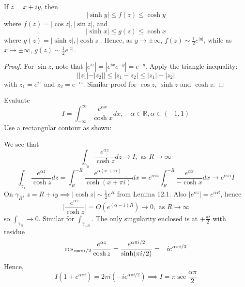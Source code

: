 \documentclass[a4paper]{article}
\begin{document}
\begin{lemma}
If $z=x+iy$, then
$$|\sinh y|\leq f(z)\leq\cosh y$$
where $f(z)=|\cos z|,|\sin z|$, and
$$|\sinh x|\leq g(z)\leq\cosh x$$
where $g(z)=|\sinh z|,|\cosh z|$. Hence, as $y\rightarrow\pm\infty$, $f(z)\sim\frac{1}{2}e^{|y|}$, while as $x\rightarrow\pm\infty$, $g(z)\sim\frac{1}{2}e^{|x|}$.
\end{lemma}
\begin{proof}
For $\sin z$, note that $|e^{iz}|=|e^{ix}e^{-y}|=e^{-y}$. Apply the triangle inequality:
$$||z_1|-|z_2||\leq|z_1-z_2|\leq|z_1|+|z_2|$$
with $z_1=e^{iz}$ and $z_2=e^{-iz}$. Similar proof for $\cos z$, $\sinh z$ and $\cosh z$.
\end{proof}
\begin{eg}
Evaluate
$$I=\int_{-\infty}^\infty\frac{e^{\alpha x}}{\cosh x}dx,\quad \alpha\in\mathbb{R},\alpha\in(-1,1)$$
Use a rectangular contour as shown:
  \begin{center}
  \end{center}
 We see that
 $$\int_{\gamma_0}\frac{e^{\alpha z}}{\cosh z}dz\rightarrow I,\text{ as }R\rightarrow\infty$$
 $$\int_{\gamma_1}\frac{e^{\alpha z}}{\cosh z}dz=\int_{R}^{-R}\frac{e^{\alpha(x+\pi i)}}{\cosh(x+\pi i)}dx=e^{\alpha\pi i}\int_R^{-R}\frac{e^{\alpha x}}{-\cosh x}dx\rightarrow e^{\alpha\pi i}I$$
 On $\gamma_R$, $z=R+iy\implies|\cosh z|\sim\frac{1}{2}e^R$ from Lemma 12.1. Also $|e^{\alpha z}|=e^{\alpha R}$, hence
 $$\bigg|\frac{e^{\alpha z}}{\cosh z}\bigg|=O(e^{(\alpha-1)R})\rightarrow 0,\text{  as }R\rightarrow\infty$$
 so $\int_{\gamma_R}\rightarrow 0$. Similar for $\int_{\gamma_{-R}}$. The only singularity enclosed is at $+\frac{\pi i}{2}$ with residue
 $$\operatorname{res}_{z=\pi i/2}\frac{e^{\alpha z}}{\cosh z}=\frac{e^{\alpha\pi i/2}}{\sinh(\pi i/2)}=-ie^{\alpha\pi i/2}$$
 Hence,
 $$I(1+e^{\alpha\pi i})=2\pi i(-ie^{\alpha\pi i/2})\implies I=\pi\sec\frac{\alpha\pi}{2}$$
\end{eg}
\end{document}
